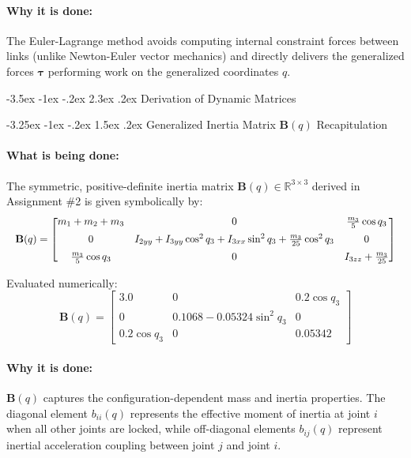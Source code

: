 ﻿\documentclass[11pt, a4paper]{article}
\makeatletter
\renewcommand{\section}{\@startsection{section}{1}{\z@}%
    {-3.5ex \@plus -1ex \@minus -.2ex}%
    {2.3ex \@plus .2ex}%
    {\normalfont\Large\bfseries\color{brandblue}}}
\renewcommand{\subsection}{\@startsection{subsection}{2}{\z@}%
    {-3.25ex \@plus -1ex \@minus -.2ex}%
    {1.5ex \@plus .2ex}%
    {\normalfont\large\bfseries\color{brandaccent}}}
\makeatother
\begin{document}
\paragraph{Why it is done:}
The Euler-Lagrange method avoids computing internal constraint forces between links (unlike Newton-Euler vector mechanics) and directly delivers the generalized forces $\boldsymbol{\tau}$ performing work on the generalized coordinates $q$.

\section{Derivation of Dynamic Matrices}

\subsection{Generalized Inertia Matrix \texorpdfstring{$\mathbf{B}(q)$}{B(q)} Recapitulation}
\paragraph{What is being done:}
The symmetric, positive-definite inertia matrix $\mathbf{B}(q) \in \mathbb{R}^{3 \times 3}$ derived in Assignment \#2 is given symbolically by:
\begin{equation}
\resizebox{\linewidth}{!}{$
\mathbf{B}(q) = \begin{bmatrix}
m_1 + m_2 + m_3 & 0 & \frac{m_3}{5}\cos q_3 \\[0.5em]
0 & I_{2yy} + I_{3yy}\cos^2 q_3 + I_{3xx}\sin^2 q_3 + \frac{m_3}{25}\cos^2 q_3 & 0 \\[0.5em]
\frac{m_3}{5}\cos q_3 & 0 & I_{3zz} + \frac{m_3}{25}
\end{bmatrix}
$}
\end{equation}

Evaluated numerically:
\begin{equation}
\mathbf{B}(q) = \begin{bmatrix}
3.0 & 0 & 0.2\cos q_3 \\
0 & 0.1068 - 0.05324\sin^2 q_3 & 0 \\
0.2\cos q_3 & 0 & 0.05342
\end{bmatrix}
\end{equation}

\paragraph{Why it is done:}
$\mathbf{B}(q)$ captures the configuration-dependent mass and inertia properties. The diagonal element $b_{ii}(q)$ represents the effective moment of inertia at joint $i$ when all other joints are locked, while off-diagonal elements $b_{ij}(q)$ represent inertial acceleration coupling between joint $j$ and joint $i$.
\end{document}

